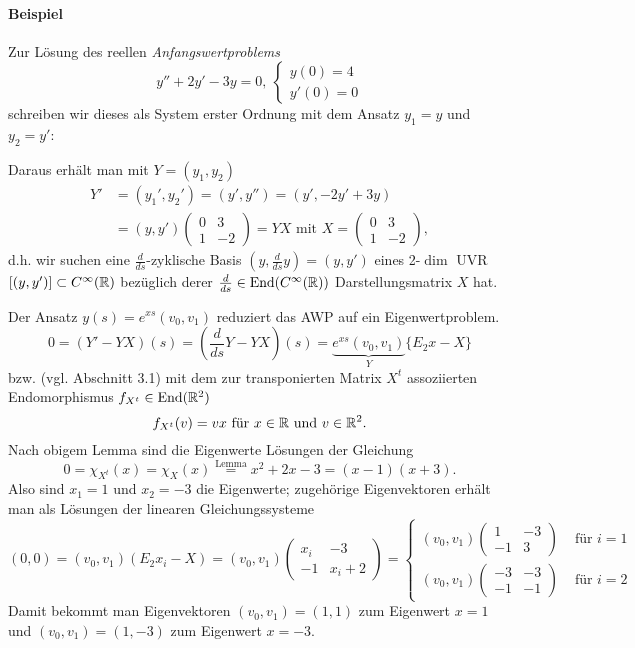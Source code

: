 \paragraph{Beispiel}
	Zur Lösung des reellen \emph{Anfangswertproblems}
		\[ y'' + 2y' - 3y = 0,\ 
		\begin{cases}
			y(0)=4 \\
			y'(0)=0
		\end{cases} \]
	schreiben wir dieses als System erster Ordnung mit dem Ansatz $ y_1 = y $ und $y_2 = y' $:
	
	Daraus erhält man mit $ Y= (y_1,y_2) $
	  \begin{align*}
		 Y' &= (y_1',y_2') = (y',y'') = (y',-2y'+3y)\\
		 &= (y,y') \begin{pmatrix}
		 	0 & 3\\ 1 & -2
		 \end{pmatrix} = YX	\text{ mit }
		 X= \begin{pmatrix}
			0 & 3\\ 1 & -2
		\end{pmatrix},
		\end{align*}
	d.h. wir suchen eine $ \frac{d}{ds} $-zyklische Basis $ (y,\frac{d}{ds}y) = (y,y') $ eines 2-$ \dim $ UVR $ [(y,y')]\subset C^\infty(\mathbb{R}) $ bezüglich derer $ \frac{d}{ds}\in \operatorname{End}(C^\infty(\mathbb{R})) $ Darstellungsmatrix $ X $ hat.
	
	Der Ansatz $ y(s) = e^{xs} (v_0,v_1)$ reduziert das AWP auf ein Eigenwertproblem.
		\[ 0 = \left(Y'-YX\right)(s) = \left(\frac{d}{ds}Y - YX\right)(s) = \underset{Y}{\underbrace{e^{xs}(v_0,v_1)}} \{E_2x-X\}\]
	bzw. (vgl. Abschnitt 3.1) mit dem zur transponierten Matrix $ X^t $ assoziierten Endomorphismus $ f_{X^t}\in \operatorname{End}(\mathbb{R}^2) $
		\[ f_{X^t}(v) = vx \text{ für }x\in\mathbb{R} \text{ und }v\in \mathbb{R}^2. \]
	Nach obigem Lemma sind die Eigenwerte Lösungen der Gleichung
		\[ 0 = \chi_{X^t}(x) = \chi_X(x) \overset{\text{Lemma}}{=} x^2+2x-3 = (x-1)(x+3). \]
	Also sind $ x_1 = 1 $ und $ x_2 = -3 $ die Eigenwerte; zugehörige Eigenvektoren erhält man als Lösungen der linearen Gleichungssysteme
		\[ (0,0) = (v_0,v_1)(E_2x_i-X)= (v_0,v_1)\begin{pmatrix}
		x_i&-3\\-1&x_i+2
		\end{pmatrix} = \begin{cases}
		(v_0,v_1)\begin{pmatrix}
		1&-3\\-1&3
		\end{pmatrix}& \text{ für } i = 1\\
		(v_0,v_1)\begin{pmatrix}
		-3&-3\\-1&-1
		\end{pmatrix}& \text{ für } i = 2
		\end{cases} \]
	Damit bekommt man Eigenvektoren $ (v_0,v_1) = (1,1) $ zum Eigenwert $ x=1 $ und $ (v_0,v_1) = (1,-3) $ zum Eigenwert $ x = -3 $.
	
